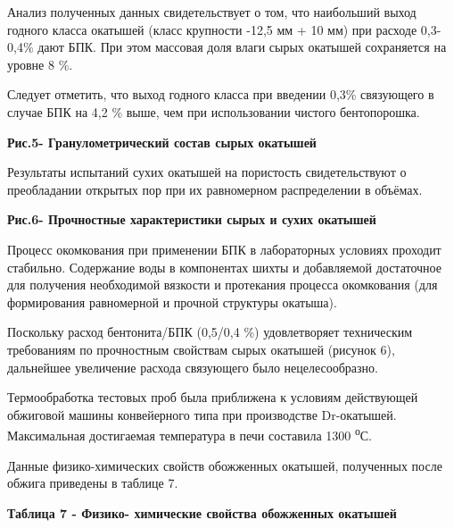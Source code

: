 Анализ полученных данных свидетельствует о том, что наибольший выход
годного класса окатышей (класс крупности -12,5 мм + 10 мм) при расходе
0,3-0,4\% дают БПК. При этом массовая доля влаги сырых окатышей
сохраняется на уровне 8 \%.

Следует отметить, что выход годного класса при введении 0,3\% связующего
в случае БПК на 4,2 \% выше, чем при использовании чистого бентопорошка.

{\bfseries Рис.5- Гранулометрический состав сырых окатышей}

Результаты испытаний сухих окатышей на пористость свидетельствуют о
преобладании открытых пор при их равномерном распределении в объёмах.

{\bfseries Рис.6- Прочностные характеристики сырых и сухих окатышей}

Процесс окомкования при применении БПК в лабораторных условиях проходит
стабильно. Содержание воды в компонентах шихты и добавляемой достаточное
для получения необходимой вязкости и протекания процесса окомкования
(для формирования равномерной и прочной структуры окатыша).

Поскольку расход бентонита/БПК (0,5/0,4 \%) удовлетворяет техническим
требованиям по прочностным свойствам сырых окатышей (рисунок 6),
дальнейшее увеличение расхода связующего было нецелесообразно.

Термообработка тестовых проб была приближена к условиям действующей
обжиговой машины конвейерного типа при производстве Dr-окатышей.
Максимальная достигаемая температура в печи составила 1300
\textsuperscript{о}С.

Данные физико-химических свойств обожженных окатышей, полученных после
обжига приведены в таблице 7.

{\bfseries Таблица 7 - Физико- химические свойства обожженных окатышей}

